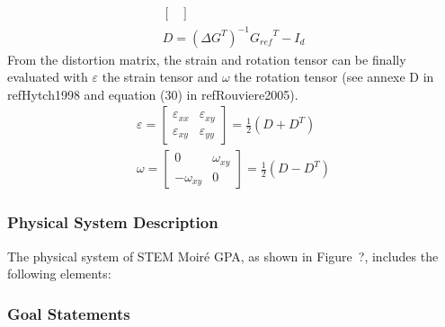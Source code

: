 \documentclass[12pt]{article}
\newcommand{\progname}{STEM Moir{\'e} GPA}
\begin{document}
\begin{itemize}
\begin{equation}
\begin{gathered}
\begin{bmatrix}
	\end{bmatrix} \\
D = ({\Delta G}^{T})^{-1}{G_{ref}}^{T}-I_{d}
\end{gathered}
\label{eq:strain_1}
\end{equation}
From the distortion matrix, the strain and rotation tensor can be finally evaluated with $\varepsilon$ the strain tensor and $\omega$ the rotation tensor (see annexe D in ref{Hytch1998} and equation (30) in ref{Rouviere2005}). 
\begin{equation}
\begin{gathered}
\varepsilon = \begin{bmatrix}
	\varepsilon_{xx} & \varepsilon_{xy} \\
	\varepsilon_{xy} & \varepsilon_{yy} 
	\end{bmatrix} = \frac{1}{2}(D+D^{T}) \\
\omega = \begin{bmatrix}
	0 & \omega_{xy} \\
	-\omega_{xy} & 0 
	\end{bmatrix} = \frac{1}{2}(D-D^{T})
\end{gathered}
\label{eq:strain_2}
\end{equation}


\end{itemize}


\subsubsection{Physical System Description}

The physical system of \progname{}, as shown in Figure~?,
includes the following elements:





\subsubsection{Goal Statements}
\end{document}
